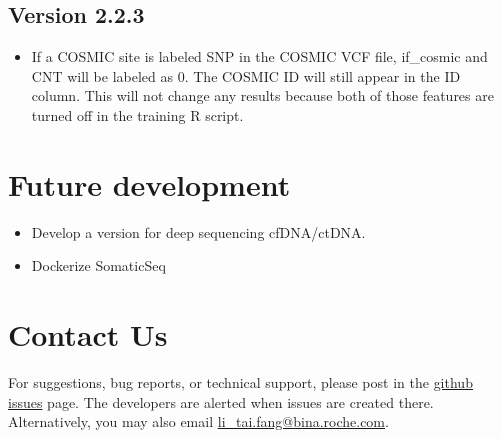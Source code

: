 \documentclass[10pt,letterpaper]{article}
\begin{document}
\begin{sloppypar}
\begin{itemize}
\end{itemize}



\subsection{Version 2.2.3}

\begin{itemize}

  \item
  If a COSMIC site is labeled SNP in the COSMIC VCF file, if\_cosmic and CNT will be labeled as 0. The COSMIC ID will still appear in the ID column. This will not change any results because both of those features are turned off in the training R script. 
  
\end{itemize}






\section{Future development}

\begin{itemize}

  \item
  Develop a version for deep sequencing cfDNA/ctDNA.
  
  \item
  Dockerize SomaticSeq
  
\end{itemize}











\section{Contact Us}
For suggestions, bug reports, or technical support, please post in the \href{https://github.com/bioinform/somaticseq/issues}{github issues} page. The developers are alerted when issues are created there. Alternatively, you may also email \href{mailto:li_tai.fang@bina.roche.com}{li\_tai.fang@bina.roche.com}. 

\end{sloppypar}
\end{document}
